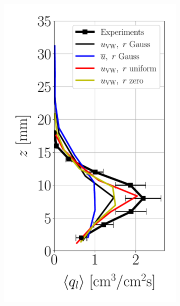 \begin{figure}[ht]
\flushleft
\begin{subfigure}[b]{0.2\textwidth}
	\flushleft
   \includegraphics[scale=0.35]{./part2_developments/figures_ch6_lagrangian_JICF/params_spray_velocities/profiles/flux_along_z}
\end{subfigure}
\hspace*{0.5in}
\begin{subfigure}[b]{0.2\textwidth}
	\flushleft

\end{subfigure}
\end{figure}
